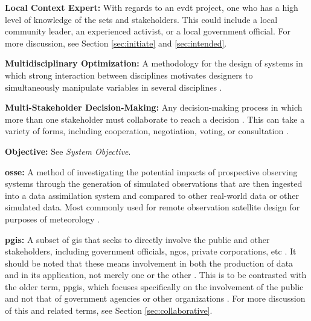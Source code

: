 \textbf{Local Context Expert:} With regards to an \ac{evdt} project, one who has a high level of knowledge of the \ac{sets} and stakeholders. This could include a local community leader, an experienced activist, or a local government official. For more discussion, see Section \ref{sec:initiate} and \ref{sec:intended}.

\textbf{Multidisciplinary Optimization:} A methodology for the design of systems in which strong interaction between disciplines motivates designers to simultaneously manipulate variables in several disciplines \cite{sobieszczanski-sobieskiMultidisciplinaryAerospaceDesign1997}.

\textbf{Multi-Stakeholder Decision-Making:} Any decision-making process in which more than one stakeholder must collaborate to reach a decision \cite{fitzgeraldRecommendationsFramingMultistakeholder2016}. This can take a variety of forms, including cooperation, negotiation, voting, or consultation \cite{garberMultiStakeholderTradeSpace2015}.

\textbf{Objective:} See \textit{System Objective}.

\textbf{\acf{osse}:} A method of investigating the potential impacts of prospective observing systems through the generation of simulated observations that are then ingested into a data assimilation system and compared to other real-world data or other simulated data. Most commonly used for remote observation satellite design for purposes of meteorology \cite{masutaniObservingSystemSimulation2010} .


\textbf{\acf{pgis}:} A subset of \ac{gis} that seeks to directly involve the public and other stakeholders, including government officials, \acp{ngo}, private corporations, etc \cite{sieberPublicParticipationGeographic2006}. It should be noted that these means involvement in both the production of data and in its application, not merely one or the other \cite{weinerParticipatoryGeographicInformation2007, talenBottomUpGIS2000}. This is to be contrasted with the older term, \ac{ppgis}, which focuses specifically on the involvement of the public and not that of government agencies or other organizations \cite{sieberPublicParticipationGeographic2006}. For more discussion of this and related terms, see Section \ref{sec:collaborative}.

